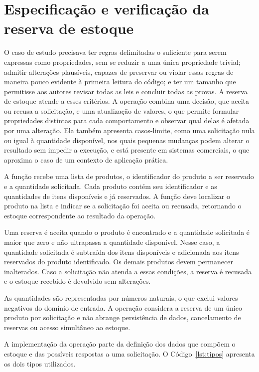 \section{Especificação e verificação da reserva de estoque}
\label{sect:caso}

O caso de estudo precisava ter regras delimitadas o suficiente para serem expressas como propriedades, sem se reduzir a uma única propriedade trivial; admitir alterações plausíveis, capazes de preservar ou violar essas regras de maneira pouco evidente à primeira leitura do código; e ter um tamanho que permitisse aos autores revisar todas as leis e concluir todas as provas. A reserva de estoque atende a esses critérios. A operação combina uma decisão, que aceita ou recusa a solicitação, e uma atualização de valores, o que permite formular propriedades distintas para cada comportamento e observar qual delas é afetada por uma alteração. Ela também apresenta casos-limite, como uma solicitação nula ou igual à quantidade disponível, nos quais pequenas mudanças podem alterar o resultado sem impedir a execução, e está presente em sistemas comerciais, o que aproxima o caso de um contexto de aplicação prática.

A função recebe uma lista de produtos, o identificador do produto a ser reservado e a quantidade solicitada. Cada produto contém seu identificador e as quantidades de itens disponíveis e já reservados. A função deve localizar o produto na lista e indicar se a solicitação foi aceita ou recusada, retornando o estoque correspondente ao resultado da operação.

Uma reserva é aceita quando o produto é encontrado e a quantidade solicitada é maior que zero e não ultrapassa a quantidade disponível. Nesse caso, a quantidade solicitada é subtraída dos itens disponíveis e adicionada aos itens reservados do produto identificado. Os demais produtos devem permanecer inalterados. Caso a solicitação não atenda a essas condições, a reserva é recusada e o estoque recebido é devolvido sem alterações.

As quantidades são representadas por números naturais, o que exclui valores negativos do domínio de entrada. A operação considera a reserva de um único produto por solicitação e não abrange persistência de dados, cancelamento de reservas ou acesso simultâneo ao estoque.

A implementação da operação parte da definição dos dados que compõem o estoque e das possíveis respostas a uma solicitação. O Código~\ref{lst:tipos} apresenta os dois tipos utilizados.

